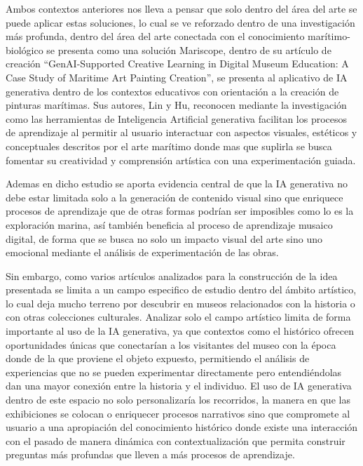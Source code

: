 \documentclass[pdflatex,sn-mathphys-num]{sn-jnl}%
\theoremstyle{thmstyleone}%
\theoremstyle{thmstyletwo}%
\theoremstyle{thmstylethree}%
\begin{document}
Ambos contextos anteriores nos lleva a pensar que solo dentro del área del arte se puede aplicar estas soluciones, lo cual se ve reforzado dentro de una investigación más profunda, dentro del área del arte conectada con el conocimiento marítimo-biológico se presenta como una solución Mariscope, dentro de su artículo de creación “GenAI-Supported Creative Learning in Digital Museum Education: A Case Study of Maritime Art Painting Creation”, se presenta al aplicativo de IA generativa dentro de los contextos educativos con orientación a la creación de pinturas marítimas. Sus autores, Lin y Hu, reconocen mediante la investigación como las herramientas de Inteligencia Artificial generativa facilitan los procesos de aprendizaje al permitir al usuario interactuar con aspectos visuales, estéticos y conceptuales descritos por el arte marítimo donde mas que suplirla se busca fomentar su creatividad y comprensión artística con una experimentación guiada.\cite{Lin2025} 

Ademas en dicho estudio se aporta evidencia central de que la IA generativa no debe estar limitada solo a la generación de contenido visual sino que enriquece procesos de aprendizaje que de otras formas podrían ser imposibles como lo es la exploración marina, así también beneficia al proceso de aprendizaje musaico digital, de forma que se busca no solo un impacto visual del arte sino uno emocional mediante el análisis de experimentación de las obras.\cite{Lin2025}

Sin embargo, como varios artículos analizados para la construcción de la idea presentada se limita a un campo especifico de estudio dentro del ámbito artístico, lo cual deja mucho terreno por descubrir en museos relacionados con la historia o con otras colecciones culturales. Analizar solo el campo artístico limita de forma importante al uso de la IA generativa, ya que contextos como el histórico ofrecen oportunidades únicas que conectarían a los visitantes del museo con la época donde de la que proviene el objeto expuesto, permitiendo el análisis de experiencias que no se pueden experimentar directamente pero entendiéndolas dan una mayor conexión entre la historia y el individuo. El uso de IA generativa dentro de este espacio no solo personalizaría los recorridos, la manera en que las exhibiciones se colocan o enriquecer procesos narrativos sino que compromete al usuario a una apropiación del conocimiento histórico donde existe una interacción con el pasado de manera dinámica con contextualización que permita construir preguntas más profundas que lleven a más procesos de aprendizaje.
\end{document}
